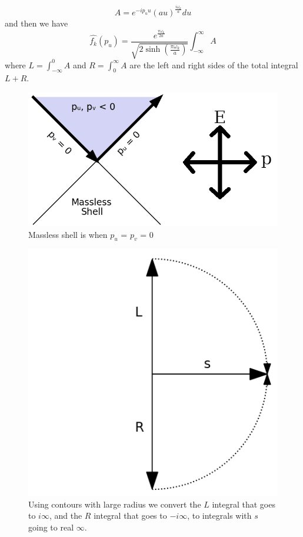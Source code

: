 \documentclass[12pt,a4paper]{article}
\begin{document}
\begin{equation}
  A = e^{-i p_u u} (au)^\frac{i\omega_k}{a} du
\end{equation}
and then we have
\begin{equation}
\label{finalnorm}
  \hat{f_k}(p_u) =  \frac{e^{\frac{\pi \omega_k}{2a}}}{\sqrt{2 \sinh \left({\frac{\pi\omega_k}{a}}\right)}}  \int_{-\infty}^\infty A
\end{equation}
where $L=\int_{-\infty}^0 A$ and $R=\int_0^\infty A$ are the left and right sides of the total integral $L + R$.

\begin{figure}[h]
\centering
\includegraphics[scale=0.5]{massless_shell.png}
\caption{Massless shell is when $p_u$ = $p_v$ = 0}
\label{masslessshell}
\end{figure}

\begin{figure}[h]
\centering
\includegraphics[scale=0.3]{contour.png}
\caption{Using contours with large radius we convert the $L$ integral that goes to $i\infty$, and the $R$ integral that goes to $-i\infty$, to integrals with $s$ going to real $\infty$.}
\label{fig:x cubed graph}
\end{figure}
\end{document}
